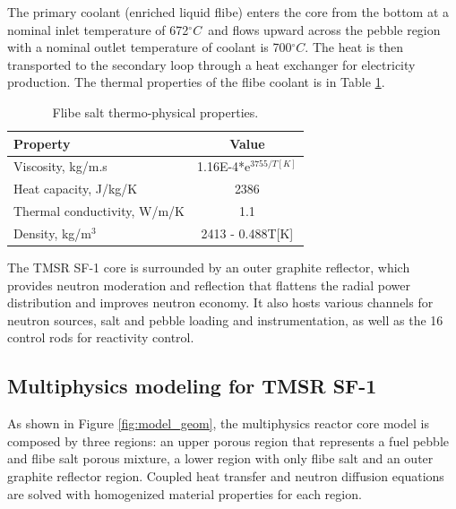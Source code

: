 \documentclass{elsarticle}
\newcommand{\degc}{{\ensuremath{^{\circ}C}}}
\begin{document}
The primary coolant (enriched liquid flibe) enters the core from the bottom at a nominal inlet temperature of 672\degc\ and flows upward across the pebble region with a nominal outlet temperature of coolant is 700\degc. The heat is then transported to the secondary loop through a heat exchanger for electricity production. The thermal properties of the flibe coolant is in Table \ref{tab:flibe}. 

\begin{table}
  \caption{Flibe salt thermo-physical properties.}
  \centering
  \begin{tabular}{lc}
    \hline
    Property & Value\\
    \hline
    Viscosity, kg/m.s & 1.16E-4*e$^{3755/T[K]}$\\
    Heat capacity, J/kg/K & 2386\\
    Thermal conductivity, W/m/K & 1.1\\
    Density, kg/m$^3$ & 2413 - 0.488T[K]\\
    \hline
  \end{tabular}
\label{tab:flibe}
\end{table}

The TMSR SF-1 core is surrounded by an outer graphite reflector, which provides neutron moderation and reflection that flattens the radial power distribution and improves neutron economy. It also hosts various channels for neutron sources, salt and pebble loading and instrumentation, as well as the 16 control rods for reactivity control.


\subsection{Multiphysics modeling for TMSR SF-1}

As shown in Figure \ref{fig:model_geom}, the multiphysics reactor core model is composed by three regions: an upper porous region that represents a fuel pebble and flibe salt porous mixture, a lower region with only flibe salt and an outer graphite reflector region. Coupled heat transfer and neutron diffusion equations are solved with homogenized material properties for each region. 
\end{document}
